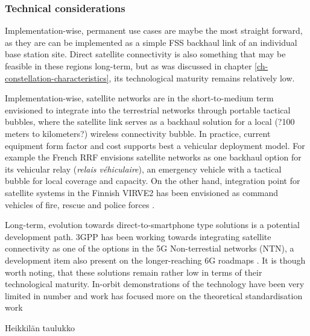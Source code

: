 \documentclass[english, 12pt, a4paper, elec, utf8, a-1b, online]{aaltothesis}
\begin{document}
\subsubsection{Technical considerations}

Implementation-wise, permanent use cases are maybe the most straight forward, as they are can be implemented as a simple FSS backhaul link of an individual base station site. Direct satellite connectivity is also something that may be feasible in these regions long-term, but as was discussed in chapter \ref{ch-constellation-characteristics}, its technological maturity remains relatively low. 

Implementation-wise, satellite networks are in the short-to-medium term envisioned to integrate into the terrestrial networks through portable tactical bubbles, where the satellite link serves as a backhaul solution for a local (?100 meters to kilometers?) wireless connectivity bubble. In practice, current equipment form factor and cost supports best a vehicular deployment model. For example the French RRF envisions satellite networks as one backhaul option for its vehicular relay (\textit{relais véhiculaire}), an emergency vehicle with a tactical bubble for local coverage and capacity. On the other hand, integration point for satellite systems in the Finnish VIRVE2 has been envisioned as command vehicles of fire, rescue and police forces \cite{RRF_VIITE,saynevirta2021satellite}.

Long-term, evolution towards direct-to-smartphone type solutions is a potential development path. 3GPP has been working towards integrating satellite connectivity as one of the options in the 5G Non-terrestial networks (NTN), a development item also present on the longer-reaching 6G roadmaps \cite{6G_ROADMAP, 3GPP_NTN_PAPERS}. It is though worth noting, that these solutions remain rather low in terms of their technological maturity. In-orbit demonstrations of the technology have been very limited in number and work has focused more on the theoretical standardisation work %

Heikkilän taulukko
\end{document}
